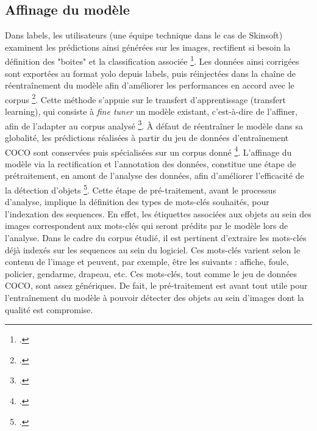 \subsection{Affinage du modèle}
Dans \gls{labels}, les utilisateurs (une équipe technique dans le cas de Skinsoft) examinent les prédictions ainsi générées sur les images, rectifient si besoin la définition des "boites" et la classification associée \footcite{kasturi2024}. Les données ainsi corrigées sont exportées au format \gls{yolo} depuis \gls{labels}, puis réinjectées dans la chaîne de réentraînement du modèle afin d'améliorer les performances en accord avec le corpus \footcite{kasturi2024}.
Cette méthode s'appuie sur le transfert d’apprentissage (transfert learning), qui consiste à \textit{fine tuner} un modèle existant, c’est-à-dire de l’affiner, afin de l'adapter au corpus analysé \footcite{bhargav2019}. À défaut de réentraîner le modèle dans sa globalité, les prédictions réalisées à partir du jeu de données d'entraînement COCO sont conservées puis spécialisées sur un corpus donné \footcite{bhargav2019}. L'affinage du modèle via la rectification et l'annotation des données, constitue une étape de prétraitement, en amont de l’analyse des données, afin d'améliorer l'efficacité de la détection d’objets \footcite{kasturi2024}.
Cette étape de pré-traitement, avant le processus d'analyse, implique la définition des types de mots-clés souhaités, pour l'indexation des \gls{sequence}s. En effet, les étiquettes associées aux objets au sein des images correspondent aux mots-clés qui seront prédits par le modèle lors de l’analyse. Dans le cadre du corpus étudié, il est pertinent d’extraire les mots-clés déjà indexés sur les \gls{sequence}s au sein du logiciel. Ces mots-clés varient selon le contenu de l’image et peuvent, par exemple, être les suivants : affiche, foule, policier, gendarme, drapeau, etc. Ces mots-clés, tout comme le jeu de données COCO, sont assez génériques. De fait, le pré-traitement est avant tout utile pour l’entraînement du modèle à pouvoir détecter des objets au sein d’images dont la qualité est compromise.   